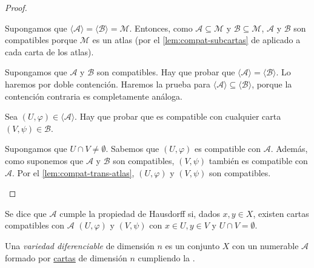 \documentclass[../VD.tex]{subfiles}
\begin{document}
\begin{proof} \item
  \begin{subproof}[\(\implies\)]
    Supongamos que \(\langle \mathcal{A} \rangle = \langle \mathcal{B} \rangle = \mathcal{M}\). Entonces, como
    \(\mathcal{A} \subseteq \mathcal{M}\) y \(\mathcal{B} \subseteq \mathcal{M}\), \(\mathcal{A}\) y
    \(\mathcal{B}\) son compatibles porque \(\mathcal{M}\) es un atlas (por el
    \cref{lem:compat-subcartas} de  aplicado a
    cada carta de los atlas).
  \end{subproof}

  \begin{subproof}[\(\impliedby\)]
    Supongamos que \(\mathcal{A}\) y \(\mathcal{B}\) son compatibles. Hay que
    probar que \(\langle \mathcal{A} \rangle = \langle \mathcal{B} \rangle\). Lo
    haremos por doble contención. Haremos la prueba para \(\langle \mathcal{A}
    \rangle \subseteq \langle \mathcal{B} \rangle\), porque la contención
    contraria es completamente análoga.

    Sea \((U, \varphi) \in
    \langle \mathcal{A} \rangle\). Hay que probar que es compatible con
    cualquier carta \((V,\psi) \in \mathcal{B}\).

      Supongamos que \(U \cap V \neq \emptyset\). Sabemos que
      \((U,\varphi)\) es compatible con \(\mathcal{A}\). Además, como suponemos
      que \(\mathcal{A}\) y \(\mathcal{B}\) son compatibles, \((V,\psi)\)
      también es compatible con \(\mathcal{A}\). Por el
      \cref{lem:compat-trans-atlas}, \((U,\varphi)\) y \((V,\psi)\) son
      compatibles.
  \end{subproof}
\end{proof}

\begin{definition}[name={propiedad de Hausdorff}, label={def:Hausdorff}]
  Se dice que \(\mathcal{A}\) cumple la propiedad de Hausdorff si, dados \(x,y
  \in X\), existen cartas compatibles con \(\mathcal{A}\) \((U, \varphi)\) y
  \((V, \psi)\) con \(x \in U, y \in V\) y \(U \cap V = \emptyset\).
\end{definition}

\begin{definition}[name={variedad},label={def:vd}]
  Una \emph{variedad diferenciable} de dimensión \(n\) es un conjunto \(X\) con
  un  numerable \(\mathcal{A}\) formado por
  \hyperref[def:carta]{cartas} de dimensión \(n\) cumpliendo la
  .
\end{definition}
\end{document}
